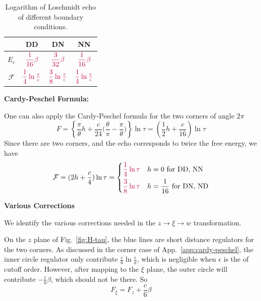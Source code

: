 \documentclass{article}
\begin{document}
\begin{table}[h]
\begin{center}
\begin{tabular}{ |c|c|c|c| } 
 \hline
   & DD & DN & NN \\ \hline  \rule[4ex]{0pt}{1pt}
  $E_c $ &  ${\color{purple} \dfrac{1}{16} \beta }$ & ${\color{purple} \dfrac{3}{32} \beta }$ &  ${\color{purple} \dfrac{1}{16} \beta} $ \\[2ex] \hline   \rule[4ex]{0pt}{1pt}
  $\mathcal{F} $ & ${\color{purple} \dfrac{1}{4}\ln \frac{\tau}{\epsilon} }$ & ${\color{purple} \dfrac{3}{8}\ln \frac{\tau}{\epsilon}} $ & ${\color{purple} \dfrac{1}{4}\ln \frac{\tau}{\epsilon} } $ \\[2ex] 
 \hline
\end{tabular}
\end{center}
\caption{Logarithm of Loschmidt echo of different boundary conditions.}
\label{tab:log_echo}
\end{table}

{\bf Cardy-Peschel Formula:}

One can also apply the Cardy-Peschel formula for the two corners of angle $2\pi$
\begin{equation}
F =  \left\{ \frac{\pi}{\theta} h + \frac{c}{24} \Big(  \frac{\theta}{\pi} - \frac{\pi}{\theta}  \Big)   \right\} \ln \tau 
= \left( \frac{1}{2} h + \frac{c}{16}  \right) \ln \tau 
\end{equation}
Since there are two corners, and the echo corresponds to twice the free energy, we have 
\begin{equation}
  \mathcal{F} = ( 2h + \frac{c}{4} ) \ln \tau 
= \left\lbrace
  \begin{aligned}
    {\color{purple}\frac{1}{4} \ln \tau}  &\quad   h = 0 \text{ for DD, NN } \\
    {\color{purple}\frac{3}{8} \ln \tau}  &\quad   h = \frac{1}{16} \text{ for DN, ND}  \\
  \end{aligned} \right. 
\end{equation}

{\bf Various Corrections}

We identify the various corrections needed in the $z \rightarrow \xi \rightarrow w$ transformation. 

On the $z$ plane of Fig.~\ref{fig:H-tau}, the blue lines are short distance regulators for the two corners. As discussed in the corner case of App.~\ref{app:cardy-peschel}, the inner circle regulator only contribute $\frac{c}{6}\ln \frac{\epsilon}{a} $, which is negligible when $\epsilon$ is the of cutoff order. However, after mapping to the $\xi$ plane, the outer circle will contribute $-\frac{c}{6} \beta$, which should not be there. So
\begin{equation}
F_{\xi } = F_{z} + \frac{c}{6} \beta 
\end{equation}
\end{document}

